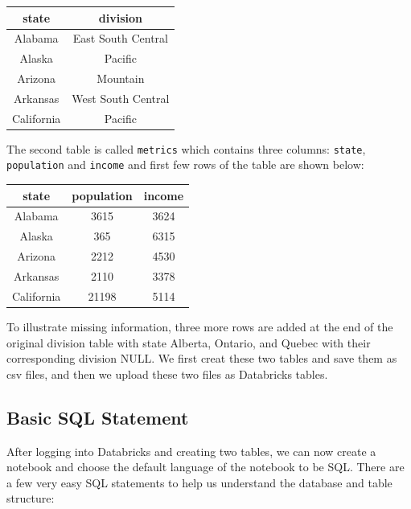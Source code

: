\documentclass[
  12pt,
]{krantz}
\begin{document}
\begin{longtable}[]{@{}cc@{}}
\toprule
state & division \\
\midrule
\endhead
Alabama & East South Central \\
Alaska & Pacific \\
Arizona & Mountain \\
Arkansas & West South Central \\
California & Pacific \\
\bottomrule
\end{longtable}

The second table is called \texttt{metrics} which contains three columns: \texttt{state}, \texttt{population} and \texttt{income} and first few rows of the table are shown below:

\begin{longtable}[]{@{}ccc@{}}
\toprule
state & population & income \\
\midrule
\endhead
Alabama & 3615 & 3624 \\
Alaska & 365 & 6315 \\
Arizona & 2212 & 4530 \\
Arkansas & 2110 & 3378 \\
California & 21198 & 5114 \\
\bottomrule
\end{longtable}

To illustrate missing information, three more rows are added at the end of the original division table with state Alberta, Ontario, and Quebec with their corresponding division NULL. We first creat these two tables and save them as csv files, and then we upload these two files as Databricks tables.

\hypertarget{basic-sql-statement}{%
\subsection{Basic SQL Statement}\label{basic-sql-statement}}

After logging into Databricks and creating two tables, we can now create a notebook and choose the default language of the notebook to be SQL. There are a few very easy SQL statements to help us understand the database and table structure:
\end{document}
